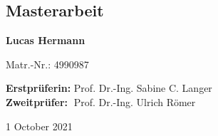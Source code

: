 \documentclass[a4paper,12pt,arial, rgb]{tubsartcl}
\begin{document}
\begin{gausspage}
\begin{segment}[c,bgcolor=tubsWhite]{2}	
\end{segment}
\begin{segment}[c,bgcolor=tubsWhite]{2}	
\end{segment}
\begin{segment}[c,bgcolor=InAGreen,fgcolor=tubsWhite]{3}					\large \noindent
\section*{\textcolor{tubsWhite}{Masterarbeit}} 	
\textbf{Lucas Hermann}

Matr.-Nr.: 4990987



\textbf{Erstprüferin:} Prof. Dr.-Ing. Sabine C. Langer\\
\textbf{Zweitprüfer:}  $\;$Prof. Dr.-Ing. Ulrich Römer
\end{segment}
\begin{segment}[innerpadding=vnone,bgcolor=tubsGreen,%
	fgcolor=tubsWhite]{1} \vskip-3pt \large%
{\small
October 2021
}
\end{segment}
\end{gausspage}
\end{document}
